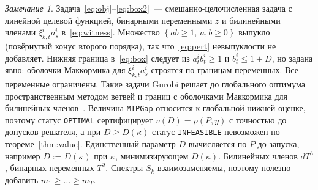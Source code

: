 \documentclass[a4paper,11pt]{article}
\theoremstyle{plain}
\theoremstyle{definition}
\theoremstyle{remark}
\newtheorem*{remark}{Замечание}
\newcommand{\set}[1]{\left\{ #1 \right\}}
\begin{document}
\begin{remark}
    Задача~\eqref{eq:obj}--\eqref{eq:box2}~--- смешанно-целочисленная задача с линейной целевой функцией, бинарными переменными $z$ и билинейными членами $\xi^i_{k,t}a^i_s$ в~\eqref{eq:witness}. Множество $\set{ab\ge1,\ a,b\ge0}$ выпукло (повёрнутый конус второго порядка), так что~\eqref{eq:pert} невыпуклости не добавляет. Нижняя граница в~\eqref{eq:box} следует из $a^i_tb^i_t\ge1$ и $b^i_t\le1+D$, но задана явно: оболочки Маккормика для $\xi^i_{k,t}a^i_s$ строятся по границам переменных. Все переменные ограничены. Такие задачи Gurobi решает до глобального оптимума пространственным методом ветвей и границ с оболочками Маккормика для билинейных членов~\cite{Gurobi}. Величина \texttt{MIPGap} относится к глобальной нижней оценке, поэтому статус \texttt{OPTIMAL} сертифицирует $v(D)=\rho(P,y)$ с точностью до допусков решателя, а при $D\ge D(\kappa)$ статус \texttt{INFEASIBLE} невозможен по теореме~\ref{thm:value}. Единственный параметр $D$ вычисляется по $P$ до запуска, например $D:=D(\kappa)$ при $\kappa$, минимизирующем $D(\kappa)$. Билинейных членов $dT^3$, бинарных переменных $T^2$. Спектры $S_k$ взаимозаменяемы, поэтому полезно добавить $m_1\ge\dots\ge m_T$.
\end{remark}
\end{document}

